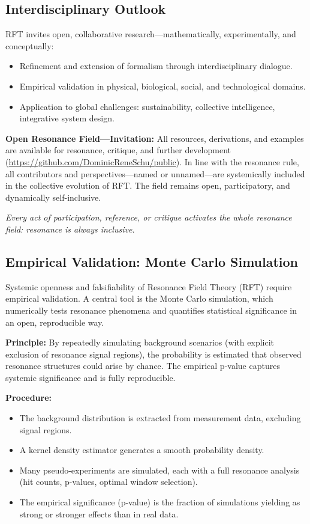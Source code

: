 \documentclass[12pt]{article}
\begin{document}
	\subsection{Interdisciplinary Outlook}
	
	RFT invites open, collaborative research—mathematically, experimentally, and conceptually:
	\begin{itemize}
		\item Refinement and extension of formalism through interdisciplinary dialogue.
		\item Empirical validation in physical, biological, social, and technological domains.
		\item Application to global challenges: sustainability, collective intelligence, integrative system design.
	\end{itemize}
	
	\medskip
	
	\textbf{Open Resonance Field—Invitation:}  
	All resources, derivations, and examples are available for resonance, critique, and further development (\url{https://github.com/DominicReneSchu/public}). In line with the resonance rule, all contributors and perspectives—named or unnamed—are systemically included in the collective evolution of RFT. The field remains open, participatory, and dynamically self-inclusive.
	
	\medskip
	
	\textit{Every act of participation, reference, or critique activates the whole resonance field: resonance is always inclusive.}

	\subsection{Empirical Validation: Monte Carlo Simulation}
	\label{sec:monte_carlo}
	
	Systemic openness and falsifiability of Resonance Field Theory (RFT) require empirical validation. A central tool is the Monte Carlo simulation, which numerically tests resonance phenomena and quantifies statistical significance in an open, reproducible way.
	
	\textbf{Principle:}  
	By repeatedly simulating background scenarios (with explicit exclusion of resonance signal regions), the probability is estimated that observed resonance structures could arise by chance. The empirical p-value captures systemic significance and is fully reproducible.
	
	\textbf{Procedure:}
	\begin{itemize}
		\item The background distribution is extracted from measurement data, excluding signal regions.
		\item A kernel density estimator generates a smooth probability density.
		\item Many pseudo-experiments are simulated, each with a full resonance analysis (hit counts, p-values, optimal window selection).
		\item The empirical significance (p-value) is the fraction of simulations yielding as strong or stronger effects than in real data.
	\end{itemize}
	
\end{document}
